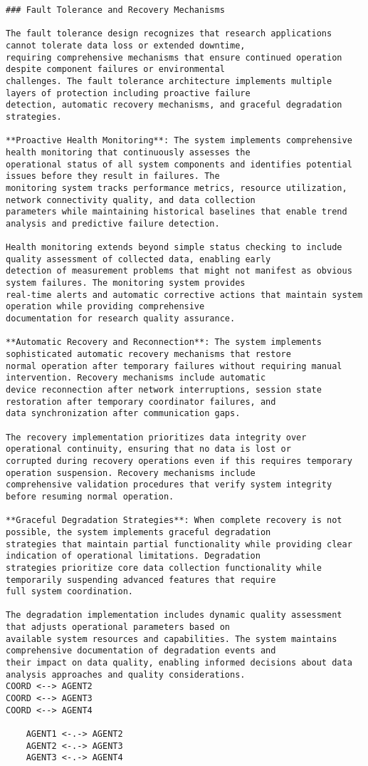 \documentclass[11pt,a4paper]{report}
\begin{document}
\begin{verbatim}
### Fault Tolerance and Recovery Mechanisms

The fault tolerance design recognizes that research applications cannot tolerate data loss or extended downtime,
requiring comprehensive mechanisms that ensure continued operation despite component failures or environmental
challenges. The fault tolerance architecture implements multiple layers of protection including proactive failure
detection, automatic recovery mechanisms, and graceful degradation strategies.

**Proactive Health Monitoring**: The system implements comprehensive health monitoring that continuously assesses the
operational status of all system components and identifies potential issues before they result in failures. The
monitoring system tracks performance metrics, resource utilization, network connectivity quality, and data collection
parameters while maintaining historical baselines that enable trend analysis and predictive failure detection.

Health monitoring extends beyond simple status checking to include quality assessment of collected data, enabling early
detection of measurement problems that might not manifest as obvious system failures. The monitoring system provides
real-time alerts and automatic corrective actions that maintain system operation while providing comprehensive
documentation for research quality assurance.

**Automatic Recovery and Reconnection**: The system implements sophisticated automatic recovery mechanisms that restore
normal operation after temporary failures without requiring manual intervention. Recovery mechanisms include automatic
device reconnection after network interruptions, session state restoration after temporary coordinator failures, and
data synchronization after communication gaps.

The recovery implementation prioritizes data integrity over operational continuity, ensuring that no data is lost or
corrupted during recovery operations even if this requires temporary operation suspension. Recovery mechanisms include
comprehensive validation procedures that verify system integrity before resuming normal operation.

**Graceful Degradation Strategies**: When complete recovery is not possible, the system implements graceful degradation
strategies that maintain partial functionality while providing clear indication of operational limitations. Degradation
strategies prioritize core data collection functionality while temporarily suspending advanced features that require
full system coordination.

The degradation implementation includes dynamic quality assessment that adjusts operational parameters based on
available system resources and capabilities. The system maintains comprehensive documentation of degradation events and
their impact on data quality, enabling informed decisions about data analysis approaches and quality considerations.
COORD <--> AGENT2
COORD <--> AGENT3
COORD <--> AGENT4

    AGENT1 <-.-> AGENT2
    AGENT2 <-.-> AGENT3
    AGENT3 <-.-> AGENT4

\end{verbatim}
\end{document}
